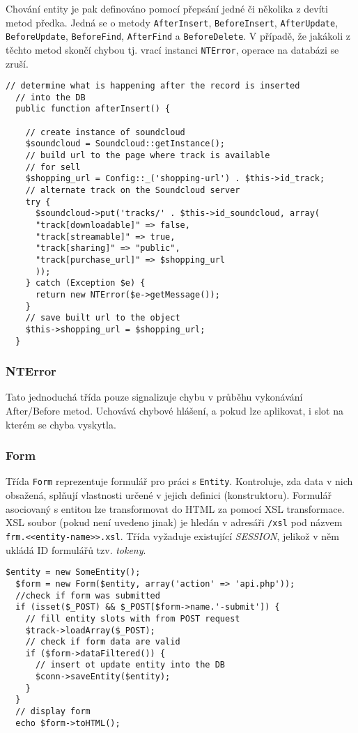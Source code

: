 \documentclass[12pt]{article}
\begin{document}
Chování entity je pak definováno pomocí přepsání jedné či několika z devíti metod předka.
Jedná se o metody \texttt{AfterInsert}, \texttt{BeforeInsert}, \texttt{AfterUpdate}, \texttt{BeforeUpdate}, \texttt{BeforeFind}, \texttt{AfterFind} a \texttt{BeforeDelete}.
V případě, že jakákoli z těchto metod skončí chybou tj. vrací instanci \texttt{NTError}, operace na databázi se zruší.
\begin{lstlisting}[caption={Metoda afterInsert.}, label={afterinsert}]
  // determine what is happening after the record is inserted
  // into the DB
  public function afterInsert() {

    // create instance of soundcloud
    $soundcloud = Soundcloud::getInstance();
    // build url to the page where track is available
    // for sell
    $shopping_url = Config::_('shopping-url') . $this->id_track;
    // alternate track on the Soundcloud server
    try {
      $soundcloud->put('tracks/' . $this->id_soundcloud, array(
      "track[downloadable]" => false,
      "track[streamable]" => true,
      "track[sharing]" => "public",
      "track[purchase_url]" => $shopping_url
      ));
    } catch (Exception $e) {
      return new NTError($e->getMessage());
    }
    // save built url to the object
    $this->shopping_url = $shopping_url;
  }
\end{lstlisting}

\subsubsection{NTError}
Tato jednoduchá třída pouze signalizuje chybu v průběhu vykonávání After/Before metod. Uchovává chybové hlášení, a pokud lze aplikovat, i slot na kterém se chyba vyskytla.

\subsubsection{Form}
Třída \texttt{Form} reprezentuje formulář pro práci s \texttt{Entity}. Kontroluje, zda data v nich obsažená, splňují vlastnosti určené v jejich definici (konstruktoru). Formulář asociovaný s entitou lze transformovat do HTML za pomocí XSL transformace. XSL soubor (pokud není uvedeno jinak) je hledán v adresáři \texttt{/xsl} pod názvem \texttt{frm.<<entity-name>>.xsl}. Třída vyžaduje existující \emph{SESSION}, jelikož v něm ukládá ID formulářů tzv. \emph{tokeny}.

\begin{lstlisting}[caption={Vytvoření formuláře pro editování hudebního podkladu.},label={trackform}]
  $entity = new SomeEntity();
  $form = new Form($entity, array('action' => 'api.php'));
  //check if form was submitted
  if (isset($_POST) && $_POST[$form->name.'-submit']) {
    // fill entity slots with from POST request
    $track->loadArray($_POST);
    // check if form data are valid
    if ($form->dataFiltered()) {
      // insert ot update entity into the DB
      $conn->saveEntity($entity);
    }
  }
  // display form
  echo $form->toHTML();
\end{lstlisting}
\end{document}

